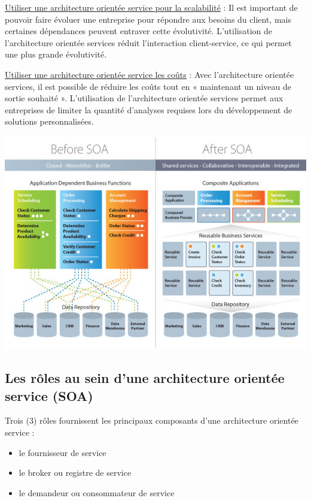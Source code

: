 \documentclass[
]{book}
\providecommand{\tightlist}{%
  \setlength{\itemsep}{0pt}\setlength{\parskip}{0pt}}
\theoremstyle{definition}
\theoremstyle{definition}
\theoremstyle{definition}
\theoremstyle{definition}
\theoremstyle{remark}
\begin{document}
\underline{Utiliser une architecture orientée service pour la scalabilité} : Il est important de pouvoir faire évoluer une entreprise pour répondre aux besoins du client, mais certaines dépendances peuvent entraver cette évolutivité. L'utilisation de l'architecture orientée services réduit l'interaction client-service, ce qui permet une plus grande évolutivité.

\underline{Utiliser une architecture orientée service les coûts} : Avec l'architecture orientée services, il est possible de réduire les coûts tout en « maintenant un niveau de sortie souhaité ». L'utilisation de l'architecture orientée services permet aux entreprises de limiter la quantité d'analyses requises lors du développement de solutions personnalisées.

\begin{center}\includegraphics[width=0.7\linewidth]{soavsmono} \end{center}

\hypertarget{les-ruxf4les-au-sein-dune-architecture-orientuxe9e-service-soa}{%
\subsection{Les rôles au sein d'une architecture orientée service (SOA)}\label{les-ruxf4les-au-sein-dune-architecture-orientuxe9e-service-soa}}

Trois (3) rôles fournissent les principaux composants d'une architecture orientée service :

\begin{itemize}
\tightlist
\item
  le fournisseur de service
\item
  le broker ou registre de service
\item
  le demandeur ou consommateur de service
\end{itemize}
\end{document}
